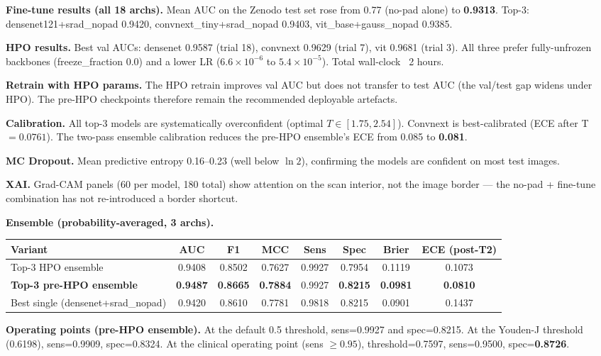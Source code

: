 \documentclass[11pt]{article}
\begin{document}
\textbf{Fine-tune results (all 18 archs).} Mean AUC on the Zenodo test
set rose from 0.77 (no-pad alone) to \textbf{0.9313}. Top-3:
densenet121+srad\_nopad 0.9420, convnext\_tiny+srad\_nopad 0.9403,
vit\_base+gauss\_nopad 0.9385.

\textbf{HPO results.} Best val AUCs: densenet 0.9587 (trial 18),
convnext 0.9629 (trial 7), vit 0.9681 (trial 3). All three prefer
fully-unfrozen backbones (freeze\_fraction 0.0) and a lower LR
($6.6\times10^{-6}$ to $5.4\times10^{-5}$). Total wall-clock ~2 hours.

\textbf{Retrain with HPO params.} The HPO retrain improves val AUC but
does not transfer to test AUC (the val/test gap widens under HPO).
The pre-HPO checkpoints therefore remain the recommended deployable
artefacts.

\textbf{Calibration.} All top-3 models are systematically overconfident
(optimal $T\in[1.75, 2.54]$). Convnext is best-calibrated (ECE after T
$= 0.0761$). The two-pass ensemble calibration reduces the pre-HPO
ensemble's ECE from 0.085 to \textbf{0.081}.

\textbf{MC Dropout.} Mean predictive entropy 0.16--0.23 (well below
$\ln 2$), confirming the models are confident on most test images.

\textbf{XAI.} Grad-CAM panels (60 per model, 180 total) show attention
on the scan interior, not the image border --- the no-pad + fine-tune
combination has not re-introduced a border shortcut.

\textbf{Ensemble (probability-averaged, 3 archs).}

\begin{center}
\begin{tabular}{lccccccc}
\toprule
Variant & AUC & F1 & MCC & Sens & Spec & Brier & ECE (post-T2) \\
\midrule
Top-3 HPO ensemble         & 0.9408 & 0.8502 & 0.7627 & 0.9927 & 0.7954 & 0.1119 & 0.1073 \\
\textbf{Top-3 pre-HPO ensemble} & \textbf{0.9487} & \textbf{0.8665} & \textbf{0.7884} & 0.9927 & \textbf{0.8215} & \textbf{0.0981} & \textbf{0.0810} \\
Best single (densenet+srad\_nopad) & 0.9420 & 0.8610 & 0.7781 & 0.9818 & 0.8215 & 0.0901 & 0.1437 \\
\bottomrule
\end{tabular}
\end{center}

\textbf{Operating points (pre-HPO ensemble).} At the default 0.5
threshold, sens=0.9927 and spec=0.8215. At the Youden-J threshold
(0.6198), sens=0.9909, spec=0.8324. At the clinical operating point
(sens $\geq 0.95$), threshold=0.7597, sens=0.9500, spec=\textbf{0.8726}.
\end{document}
